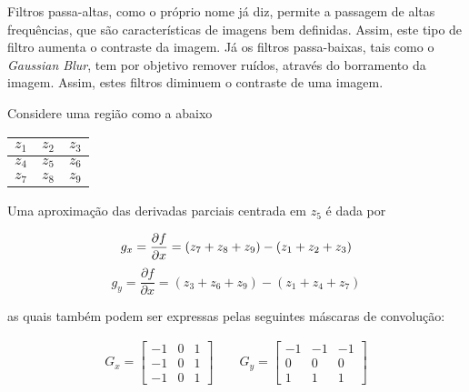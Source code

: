 \documentclass[10pt,a4paper]{article}
\begin{document}
\begin{enumerate}

Filtros passa-altas, como o próprio nome já diz, permite a passagem de altas frequências, que são características de imagens bem definidas. Assim, este tipo de filtro aumenta o contraste da imagem. Já os filtros passa-baixas, tais como o \textit{Gaussian Blur}, tem por objetivo remover ruídos, através do borramento da imagem. Assim, estes filtros diminuem o contraste de uma imagem.


Considere uma região como a abaixo

\begin{table}[!ht]
    \begin{tabular}{|c|c|c|}
        \hline
        $z_1$ & $z_2$ & $z_3$ \\\hline
        $z_4$ & $z_5$ & $z_6$ \\\hline
        $z_7$ & $z_8$ & $z_9$ \\\hline
    \end{tabular}
\end{table}

Uma aproximação das derivadas parciais centrada em $z_5$ é dada por

\begin{equation}
    g_x = \frac{\partial f}{\partial x} = (z_7 + z_8 + z_9) - (z_1 + z_2 + z_3) \\
    \label{gx}
\end{equation}
\begin{equation}
    g_y = \frac{\partial f}{\partial x} = (z_3 + z_6 + z_9) - (z_1 + z_4 + z_7)
    \label{gy}
\end{equation}

as quais também podem ser expressas pelas seguintes máscaras de convolução:

\begin{align}
G_x = \left[\begin{array}{ccc}
  -1 & 0 & 1 \\
  -1 & 0 & 1 \\
  -1 & 0 & 1
\end{array}\right]
\qquad
G_y = \left[\begin{array}{ccc}
  -1 & -1 & -1 \\
  0 & 0 & 0 \\
  1 & 1 & 1
\end{array}\right]
\label{masks}
\end{align}


\end{enumerate}
\end{document}
